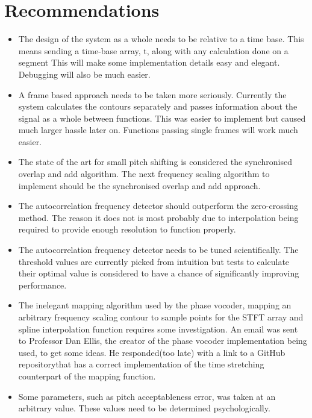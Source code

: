 \section{Recommendations}



\begin{itemize}

\item
The design of the system as a whole needs to be relative to a time base.
This means sending a time-base array, t, along with any calculation done on a
segment This will make some implementation details easy and elegant. Debugging
will also be much easier.

\item
A frame based approach needs to be taken more seriously. Currently the
system calculates the contours separately and passes information about the signal
as a whole between functions. This was easier to implement but caused much larger
hassle later on. Functions passing single frames will work much easier.

\item
The state of the art for small pitch shifting is considered the synchronised
overlap and add algorithm. The next frequency scaling algorithm to implement
should be the synchronised overlap and add approach.

\item
The autocorrelation frequency detector should outperform the zero-crossing
method. The reason it does not is most probably due to interpolation being
required to provide enough resolution to function properly.

\item
The autocorrelation frequency detector needs to be tuned scientifically. The
threshold values are currently picked from intuition but tests to calculate their
optimal value is considered to have a chance of significantly improving
performance.

\item
The inelegant mapping algorithm used by the phase vocoder, mapping an
arbitrary frequency scaling contour to sample points for the STFT array and spline
interpolation function requires some investigation. An email was sent to Professor
Dan Ellis, the creator of the phase vocoder implementation being used, to get some
ideas. He responded(too late) with a link to a GitHub
repository\footnotemark\space that has a correct implementation of the time
stretching counterpart of the mapping function.


\item
Some parameters, such as pitch acceptableness error, was taken at an
arbitrary value. These values need to be determined psychologically.

\end{itemize}
